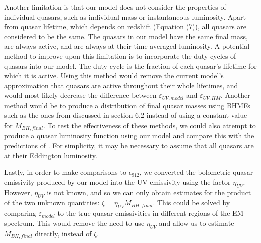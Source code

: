 \documentclass[12pt, twocolumn]{article}%
\begin{document}
Another limitation is that our model does not consider the properties of individual quasars, such as individual mass or instantaneous luminosity. Apart from quasar lifetime, which depends on redshift (Equation (7)), all quasars are considered to be the same. The quasars in our model have the same final mass, are always active, and are always at their time-averaged luminosity. A potential method to improve upon this limitation is to incorporate the duty cycles of quasars into our model. The duty cycle is the fraction of each quasar's lifetime for which it is active. Using this method would remove the current model's approximation that quasars are active throughout their whole lifetimes, and would most likely decrease the difference between $\varepsilon_{UV,model}$ and $\varepsilon_{UV,HM}$. Another method would be to produce a distribution of final quasar masses using BHMFs such as the ones from \citeauthor{BH_mass_fns} discussed in section 6.2 instead of using a constant value for $M_{BH,final}$. To test the effectiveness of these methods, we could also attempt to produce a quasar luminosity function using our model and compare this with the predictions of \cite{Hopkins}. For simplicity, it may be necessary to assume that all quasars are at their Eddington luminosity.\par

Lastly, in order to make comparisons to $\epsilon_{912}$, we converted the bolometric quasar emissivity produced by our model into the UV emissivity using the factor $\eta_{UV}$. However, $\eta_{UV}$ is not known, and so we can only obtain estimates for the product of the two unknown quantities: $\zeta=\eta_{UV}M_{BH,final}$. This could be solved by comparing $\varepsilon_{model}$ to the true quasar emissivities in different regions of the EM spectrum. This would remove the need to use $\eta_{UV}$ and allow us to estimate $M_{BH,final}$ directly, instead of $\zeta$.




\end{document}
